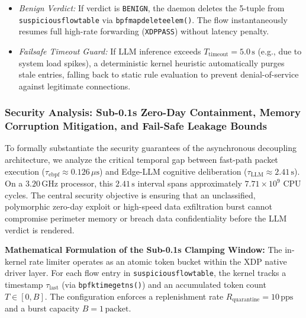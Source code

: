 \documentclass[journal]{IEEEtran}
\renewcommand{\_}{\textunderscore\allowbreak}
\begin{document}
\begin{enumerate}
\begin{itemize}
    \item \textit{Benign Verdict:} If verdict is \texttt{BENIGN}, the daemon deletes the 5-tuple from \texttt{suspicious\_flow\_table} via \texttt{bpf\_map\_delete\_elem()}. The flow instantaneously resumes full high-rate forwarding (\texttt{XDP\_PASS}) without latency penalty.
    \item \textit{Failsafe Timeout Guard:} If LLM inference exceeds $T_{\text{timeout}} = 5.0\,\text{s}$ (e.g., due to system load spikes), a deterministic kernel heuristic automatically purges stale entries, falling back to static rule evaluation to prevent denial-of-service against legitimate connections.
  \end{itemize}
\end{enumerate}

\subsubsection{Security Analysis: Sub-0.1s Zero-Day Containment, Memory Corruption Mitigation, and Fail-Safe Leakage Bounds}
To formally substantiate the security guarantees of the asynchronous decoupling architecture, we analyze the critical temporal gap between fast-path packet execution ($\tau_{\text{ebpf}} \approx 0.126\,\mu\text{s}$) and Edge-LLM cognitive deliberation ($\tau_{\text{LLM}} \approx 2.41\,\text{s}$). On a $3.20\,\text{GHz}$ processor, this $2.41\,\text{s}$ interval spans approximately $7.71 \times 10^9$ CPU cycles. The central security objective is ensuring that an unclassified, polymorphic zero-day exploit or high-speed data exfiltration burst cannot compromise perimeter memory or breach data confidentiality before the LLM verdict is rendered.

\textbf{Mathematical Formulation of the Sub-0.1s Clamping Window:}
The in-kernel rate limiter operates as an atomic token bucket within the XDP native driver layer. For each flow entry in \texttt{suspicious\_flow\_table}, the kernel tracks a timestamp $\tau_{\text{last}}$ (via \texttt{bpf\_ktime\_get\_ns()}) and an accumulated token count $T \in [0, B]$. The configuration enforces a replenishment rate $R_{\text{quarantine}} = 10\,\text{pps}$ and a burst capacity $B = 1\,\text{packet}$.
\end{document}
